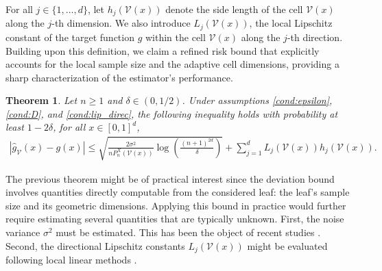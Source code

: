 \documentclass[paper=a4, fontsize=11pt]{scrartcl}
\newtheorem{theorem}{Theorem}
\begin{document}
For all $j \in \{1, \dots, d\}$, let $h_j(\mathcal{V}(x))$ denote the side length of the cell $\mathcal{V}(x)$ along the $j$-th dimension. We also introduce $L_j(\mathcal{V}(x))$, the local Lipschitz constant of the target function $g$ within the cell $\mathcal{V}(x)$ along the $j$-th direction. Building upon this definition, we claim a refined risk bound that explicitly accounts for the local sample size and the adaptive cell dimensions, providing a sharp characterization of the estimator's performance.
\begin{theorem}\label{CART_pratique}
Let $n\geq 1$ and $\delta \in (0,1/2) $. Under assumptions \ref{cond:epsilon}, \ref{cond:D}, and \ref{cond:lip_direc}, the following inequality holds with probability at least $1 - 2\delta$, for all $x \in [0,1]^d$,
\begin{align*}
       |  \hat g_{\mathcal V}(x) - g(x)| \leq \sqrt{\frac{ 2 \sigma^2 }{ n P_n^X(\mathcal V (x))  }\log\left( \frac{ (n+1) ^{2d} }{\delta} \right) } + \sum_{j=1}^d L_j(\mathcal{V}(x))  h_j(\mathcal{V}(x)).
    \end{align*}
\end{theorem}

The previous theorem might be of  practical interest since the deviation bound involves quantities
directly computable from the considered leaf: the leaf's sample size and its geometric dimensions. Applying this bound in practice would further require estimating several quantities that are typically unknown. First, the noise variance $\sigma^2$ must be estimated. This has been the object of recent studies \cite{devroye_variance,ramosaj2019consistent}. %
Second, the directional Lipschitz constants $L_j(\mathcal{V}(x))$ might  be evaluated following local linear methods \cite{fan1996}. %
\end{document}
